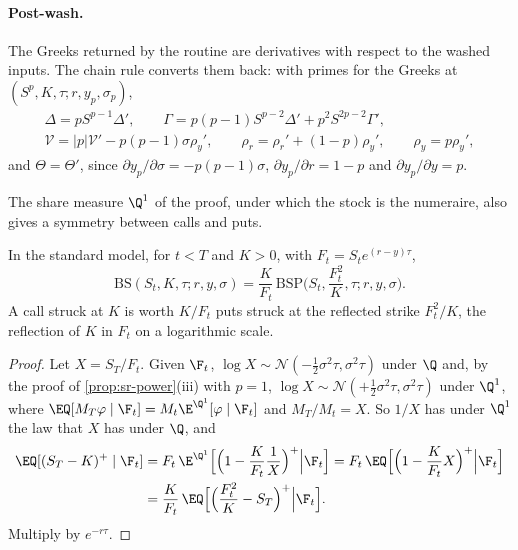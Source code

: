 \paragraph{Post-wash.} The Greeks returned by the routine are derivatives with respect to the washed
inputs. The chain rule converts them back: with primes for the Greeks at $(S^p,K,\tau;r,y_p,\sigma_p)$,
\begin{gather*}
  \Delta=pS^{p-1}\Delta',\qquad \Gamma=p(p-1)S^{p-2}\Delta'+p^2S^{2p-2}\Gamma',\\
  \mathcal V=|p|\mathcal V'-p(p-1)\sigma\rho_y',\qquad \rho_r=\rho_r'+(1-p)\rho_y',\qquad \rho_y=p\rho_y',
\end{gather*}
and $\Theta=\Theta'$, since $\partial y_p/\partial\sigma=-p(p-1)\sigma$, $\partial y_p/\partial r=1-p$ and
$\partial y_p/\partial y=p$.

The share measure $\Q^1$ of the proof, under which the stock is the numeraire, also gives a symmetry
between calls and puts.

\begin{corollary}\label{cor:sr-pcs}
In the standard model, for $t<T$ and $K>0$, with $F_t=S_te^{(r-y)\tau}$,
\[
  \mathrm{BS}(S_t,K,\tau;r,y,\sigma)=\frac K{F_t}\,\mathrm{BSP}\Big(S_t,\frac{F_t^2}K,\tau;r,y,\sigma\Big).
\]
A call struck at $K$ is worth $K/F_t$ puts struck at the reflected strike $F_t^2/K$, the reflection of $K$
in $F_t$ on a logarithmic scale.
\end{corollary}

\begin{proof}
Let $X=S_T/F_t$. Given $\F_t$, $\log X\sim\mathcal N(-\frac12\sigma^2\tau,\sigma^2\tau)$ under $\Q$ and, by the
proof of \cref{prop:sr-power}(iii) with $p=1$, $\log X\sim\mathcal N(+\frac12\sigma^2\tau,\sigma^2\tau)$ under
$\Q^1$, where $\EQ[M_T\varphi\mid\F_t]=M_t\E^{\Q^1}[\varphi\mid\F_t]$ and $M_T/M_t=X$. So $1/X$ has under $\Q^1$ the
law that $X$ has under $\Q$, and
\begin{align*}
  \EQ[(S_T-K)^+\mid\F_t]&=F_t\,\E^{\Q^1}\Big[\Big(1-\frac K{F_t}\frac1X\Big)^+\Big|\F_t\Big]
  =F_t\,\EQ\Big[\Big(1-\frac K{F_t}X\Big)^+\Big|\F_t\Big]\\
  &=\frac K{F_t}\,\EQ\Big[\Big(\frac{F_t^2}K-S_T\Big)^+\Big|\F_t\Big].
\end{align*}
Multiply by $e^{-r\tau}$.
\end{proof}

